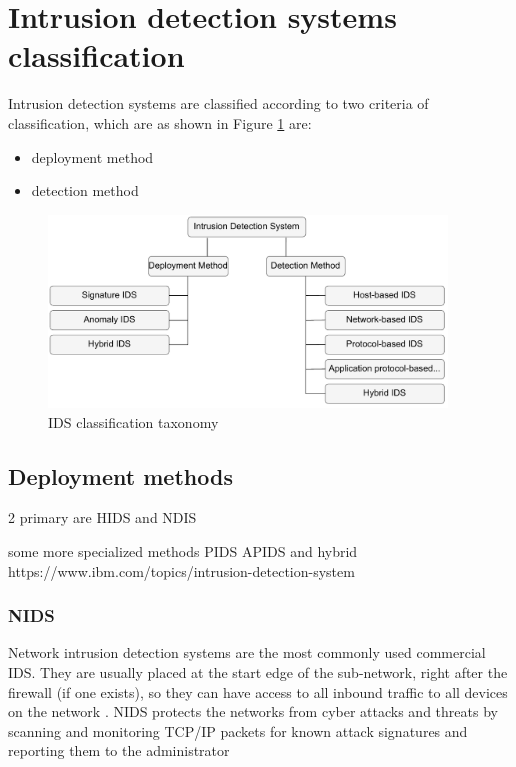 \section{Intrusion detection systems classification}
Intrusion detection systems are classified according to two criteria of classification, which are as shown in Figure \ref{fig:IDS-classification-taxonomy} are:

\firmlist
\begin{itemize}
	\item deployment method
	\item detection method
\end{itemize}

\cite{ids-classification}


\begin{figure}[h]
	\centering
	\includegraphics[width=400px]{figures/IDS_classification.pdf}
	\caption{IDS classification taxonomy}
	\label{fig:IDS-classification-taxonomy}
\end{figure}




\subsection{Deployment methods}

2 primary are HIDS and NDIS 

some more specialized methods PIDS APIDS and hybrid
https://www.ibm.com/topics/intrusion-detection-system


\subsubsection{NIDS}
Network intrusion detection systems are the most commonly used commercial IDS. They are usually placed at the start edge of the sub-network, right after the firewall (if one exists), so they can have access to all inbound traffic to all devices on the network \cite{NIST-IDS}. NIDS protects the networks from cyber attacks and threats by scanning and monitoring TCP/IP packets for known attack signatures and reporting them to the administrator \cite{NIDS-ip-tcp}

